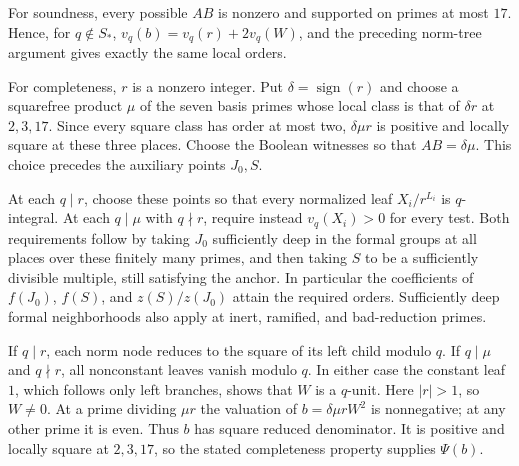 For soundness, every possible $AB$ is nonzero and supported on
primes at most $17$. Hence, for $q\notin S_*$,
$v_q(b)=v_q(r)+2v_q(W)$, and the preceding norm-tree argument
gives exactly the same local orders.

For completeness, $r$ is a nonzero integer. Put
$\delta=\operatorname{sign}(r)$ and choose a squarefree product
$\mu$ of the seven basis primes whose local class is that of
$\delta r$ at $2,3,17$. Since every square class has order at
most two, $\delta\mu r$ is positive and locally square at these
three places. Choose the Boolean witnesses so that $AB=\delta\mu$.
This choice precedes the auxiliary points $J_0,S$.

At each $q\mid r$, choose these points so that every normalized
leaf $X_i/r^{L_i}$ is $q$-integral. At each $q\mid\mu$ with
$q\nmid r$, require instead $v_q(X_i)>0$ for every test.
Both requirements follow by taking $J_0$ sufficiently deep in
the formal groups at all places over these finitely many primes,
and then taking $S$ to be a sufficiently divisible multiple,
still satisfying the anchor. In particular the coefficients of
$f(J_0)$, $f(S)$, and $z(S)/z(J_0)$ attain the required orders.
Sufficiently deep formal neighborhoods also apply at inert,
ramified, and bad-reduction primes.

If $q\mid r$, each norm node reduces to the square of its left
child modulo $q$. If $q\mid\mu$ and $q\nmid r$, all nonconstant
leaves vanish modulo $q$. In either case the constant leaf $1$,
which follows only left branches, shows that $W$ is a $q$-unit.
Here $|r|>1$, so $W\ne0$. At a prime dividing $\mu r$ the
valuation of $b=\delta\mu rW^2$ is nonnegative; at any other
prime it is even. Thus $b$ has square reduced denominator.
It is positive and locally square at $2,3,17$, so the stated
completeness property supplies $\Psi(b)$.
